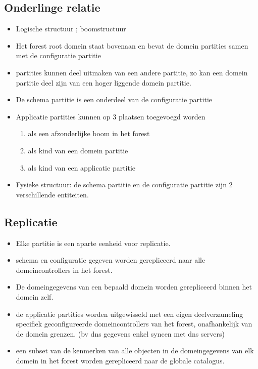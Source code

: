 \subsection{Onderlinge relatie}
\begin{itemize}
\item Logische structuur ; boomstructuur
\item Het forest root domein staat bovenaan en bevat de domein partities samen met de configuratie partitie
\item partities kunnen deel uitmaken van een andere partitie, zo kan een domein partitie deel zijn van een hoger liggende domein partitie.
\item De schema partitie is een onderdeel van de configuratie partitie
\item Applicatie partities kunnen op 3 plaatsen toegevoegd worden
\begin{enumerate}
\item als een afzonderlijke boom in het forest
\item als kind van een domein partitie
\item als kind van een applicatie partitie
\end{enumerate}
\item Fysieke structuur: de schema partitie en de configuratie partitie zijn 2 verschillende entiteiten.
\end{itemize}

\subsection{Replicatie}
\begin{itemize}
\item Elke partitie is een aparte eenheid voor replicatie.
\item schema en configuratie gegeven worden gerepliceerd naar alle domeincontrollers in het forest. 
\item De domeingegevens van een bepaald domein worden gerepliceerd binnen het domein zelf.
\item de applicatie partities worden uitgewisseld met een eigen deelverzameling specifiek geconfigureerde domeincontrollers van het forest, onafhankelijk van de domein grenzen. (bv dns gegevens enkel syncen met dns servers)
\item een subset van de kenmerken van alle objecten in de domeingegevens van elk domein in het forest worden gerepliceerd naar de globale catalogus.
\end{itemize}